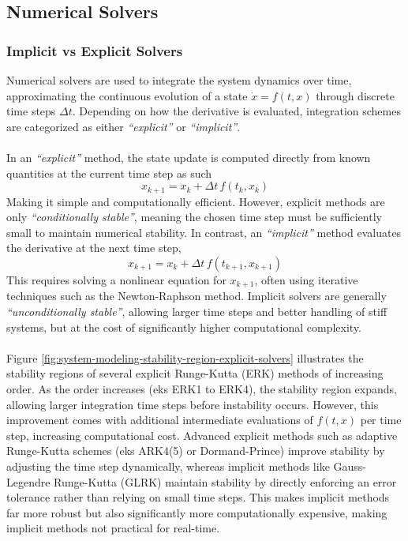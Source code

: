 \subsection{Numerical Solvers}
\subsubsection{Implicit vs Explicit Solvers}
Numerical solvers are used to integrate the system dynamics over time, approximating the continuous evolution of a state $\dot{x} = f(t, x)$ through discrete time steps $\Delta t$. Depending on how the derivative is evaluated, integration schemes are categorized as either \textit{``explicit''} or \textit{``implicit''}.  
\\ \\
In an \textit{``explicit''} method, the state update is computed directly from known quantities at the current time step as such
$$
    x_{k+1} = x_k + \Delta t \, f(t_k, x_k)
$$
Making it simple and computationally efficient. However, explicit methods are only \textit{``conditionally stable''}, meaning the chosen time step must be sufficiently small to maintain numerical stability. In contrast, an \textit{``implicit''} method evaluates the derivative at the next time step,
$$
    x_{k+1} = x_k + \Delta t \, f(t_{k+1}, x_{k+1})
$$
This requires solving a nonlinear equation for $x_{k+1}$, often using iterative techniques such as the Newton-Raphson method. Implicit solvers are generally \textit{``unconditionally stable''}, allowing larger time steps and better handling of stiff systems, but at the cost of significantly higher computational complexity.  
\\ \\
Figure \ref{fig:system-modeling-stability-region-explicit-solvers} illustrates the stability regions of several explicit Runge-Kutta (ERK) methods of increasing order. As the order increases (eks ERK1 to ERK4), the stability region expands, allowing larger integration time steps before instability occurs. However, this improvement comes with additional intermediate evaluations of $f(t, x)$ per time step, increasing computational cost. Advanced explicit methods such as adaptive Runge-Kutta schemes (eks ARK4(5) or Dormand-Prince) improve stability by adjusting the time step dynamically, whereas implicit methods like Gauss-Legendre Runge-Kutta (GLRK) maintain stability by directly enforcing an error tolerance rather than relying on small time steps. This makes implicit methods far more robust but also significantly more computationally expensive, making implicit methods not practical for real-time. 
